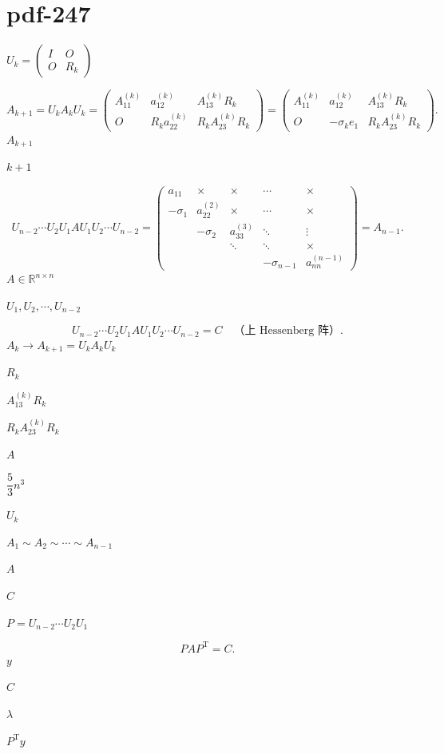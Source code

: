 \documentclass[UTF8,fontset=fandol]{ctexart}
\begin{document}
\section*{pdf-247}
$U_k=\begin{pmatrix}I&O\\O&R_k\end{pmatrix}$\par
\[
A_{k+1}=U_kA_kU_k=
\begin{pmatrix}
A_{11}^{(k)}&a_{12}^{(k)}&A_{13}^{(k)}R_k\\
O&R_ka_{22}^{(k)}&R_kA_{23}^{(k)}R_k
\end{pmatrix}
=
\begin{pmatrix}
A_{11}^{(k)}&a_{12}^{(k)}&A_{13}^{(k)}R_k\\
O&-\sigma_ke_1&R_kA_{23}^{(k)}R_k
\end{pmatrix}.
\tag{9.3.3}
\]
$A_{k+1}$\par
$k+1$\par
\[
U_{n-2}\cdots U_2U_1AU_1U_2\cdots U_{n-2}
=\begin{pmatrix}
a_{11}&\times&\times&\cdots&\times\\
-\sigma_1&a_{22}^{(2)}&\times&\cdots&\times\\
&-\sigma_2&a_{33}^{(3)}&\ddots&\vdots\\
&&\ddots&\ddots&\times\\
&&&-\sigma_{n-1}&a_{nn}^{(n-1)}
\end{pmatrix}=A_{n-1}.
\]
$A\in\mathbb R^{n\times n}$\par
$U_1,U_2,\cdots,U_{n-2}$\par
\[
U_{n-2}\cdots U_2U_1AU_1U_2\cdots U_{n-2}=C\quad\text{（上 Hessenberg 阵）}.
\]
$A_k\to A_{k+1}=U_kA_kU_k$\par
$R_k$\par
$A_{13}^{(k)}R_k$\par
$R_kA_{23}^{(k)}R_k$\par
$A$\par
$\dfrac53n^3$\par
$U_k$\par
$A_1\sim A_2\sim\cdots\sim A_{n-1}$\par
$A$\par
$C$\par
$P=U_{n-2}\cdots U_2U_1$\par
\[
PAP^{\mathrm T}=C.
\]
$y$\par
$C$\par
$\lambda$\par
$P^{\mathrm T}y$\par
\end{document}

